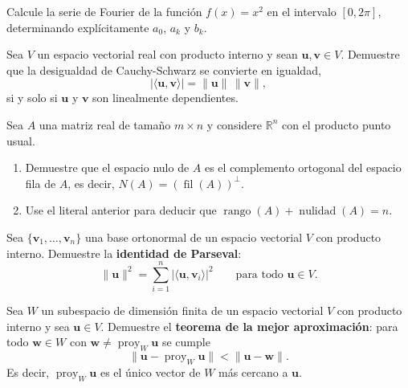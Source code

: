 \begin{prob}
Calcule la serie de Fourier de la función $f(x)=x^2$ en el intervalo $[0,2\pi]$, determinando explícitamente $a_0$, $a_k$ y $b_k$.
\end{prob}

\begin{prob}
Sea $V$ un espacio vectorial real con producto interno y sean $\mathbf{u},\mathbf{v} \in V$. Demuestre que la desigualdad de Cauchy-Schwarz se convierte en igualdad,
\[
|\langle \mathbf{u}, \mathbf{v} \rangle| = \|\mathbf{u}\|\,\|\mathbf{v}\|,
\]
si y solo si $\mathbf{u}$ y $\mathbf{v}$ son linealmente dependientes.
\end{prob}

\begin{prob}
Sea $A$ una matriz real de tamaño $m \times n$ y considere $\mathbb{R}^n$ con el producto punto usual.
\begin{enumerate}[$a)$]
\item Demuestre que el espacio nulo de $A$ es el complemento ortogonal del espacio fila de $A$, es decir, $N(A) = \left(\operatorname{fil}(A)\right)^{\perp}$.
\item Use el literal anterior para deducir que $\operatorname{rango}(A) + \operatorname{nulidad}(A) = n$.
\end{enumerate}
\end{prob}

\begin{prob}
Sea $\{\mathbf{v}_1, \dots, \mathbf{v}_n\}$ una base ortonormal de un espacio vectorial $V$ con producto interno. Demuestre la \textbf{identidad de Parseval}:
\[
\|\mathbf{u}\|^2 = \sum_{i=1}^{n} |\langle \mathbf{u}, \mathbf{v}_i \rangle|^2 \qquad \text{para todo } \mathbf{u} \in V.
\]
\end{prob}

\begin{prob}
Sea $W$ un subespacio de dimensión finita de un espacio vectorial $V$ con producto interno y sea $\mathbf{u} \in V$. Demuestre el \textbf{teorema de la mejor aproximación}: para todo $\mathbf{w} \in W$ con $\mathbf{w} \neq \operatorname{proy}_W \mathbf{u}$ se cumple
\[
\|\mathbf{u} - \operatorname{proy}_W \mathbf{u}\| < \|\mathbf{u} - \mathbf{w}\|.
\]
Es decir, $\operatorname{proy}_W \mathbf{u}$ es el único vector de $W$ más cercano a $\mathbf{u}$.
\end{prob}
